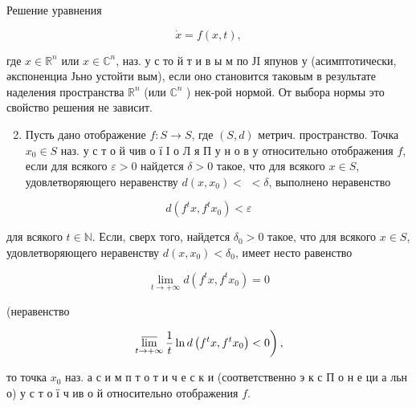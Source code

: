 \documentclass[10pt]{article}
\begin{document}
Решение уравнения



\[

\dot{x}=f(x, t),

\]



где $x \in \mathbb{R}^{n}$ или $x \in \mathbb{C}^{n}$, наз. у с то й т и в ы м по ЈI япунов у (асимптотически, әкспоненциа Јьно устойти вым), если оно становится таковым в результате наделения пространства $\mathbb{R}^{n}$ (или $\mathbb{C}^{n}$ ) нек-рой нормой. От выбора нормы это свойство решения не зависит.



\begin{enumerate}

  \setcounter{enumi}{1}

  \item Пусть дано отображение $f: S \rightarrow S$, где $(S, d)$ метрич. пространство. Точка $x_{0} \in S$ наз. у с т о й чив о ї І о Л я П у н о в у относительно отображения $f$, если для всякого $\varepsilon>0$ найдется $\delta>0$ такое, что для всякого $x \in S$, удовлетворяющего неравенству $d\left(x, x_{0}\right)<$ $<\delta$, выполнено неравенство

\end{enumerate}



\[

d\left(f^{t} x, f^{t} x_{0}\right)<\varepsilon

\]



для всякого $t \in \mathbb{N}$. Если, сверх того, найдется $\delta_{0}>0$ такое, что для всякого $x \in S$, удовлетворяющего неравенству $d\left(x, x_{0}\right)<\delta_{0}$, имеет несто равенство



\[

\lim _{t \rightarrow+\infty} d\left(f^{t} x, f^{t} x_{0}\right)=0

\]



(неравенство



\[

\left.\varlimsup_{t \rightarrow+\infty} \frac{1}{t} \ln d\left(f^{t} x, f^{t} x_{0}\right)<0\right),

\]



то точка $x_{0}$ наз. а с и м п т о т и ч е с к и (соответственно э к с П о н е ци а льн о) у с т о ї ч ив о й относительно отображения $f$.
\end{document}
